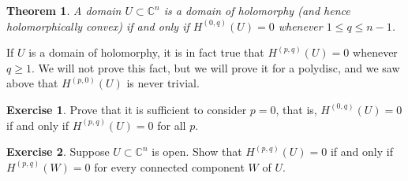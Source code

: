 \documentclass[12pt,openany]{book}
\newcommand{\C}{{\mathbb{C}}}
\theoremstyle{plain}
\newtheorem{thm}{Theorem}[section]
\theoremstyle{remark}
\theoremstyle{definition}
\newenvironment{exbox}{%
    \def\FrameCommand{\vrule width 1pt \relax\hspace{10pt}}%
    \MakeFramed{\advance\hsize-\width\FrameRestore}%
}{%
    \endMakeFramed
}
\theoremstyle{exercise}
\newtheorem{exercise}{Exercise}[section]
\theoremstyle{example}
\begin{document}
\begin{thm}
A domain $U \subset \C^n$ is a domain of holomorphy
(and hence holomorphically convex) if and only if $H^{(0,q)}(U) = 0$
whenever $1 \leq q \leq n-1$.
\end{thm}

If $U$ is a domain of holomorphy, it is in fact true that $H^{(p,q)}(U) = 0$
whenever $q \geq 1$.  We will not prove this fact, but we will prove it for a
polydisc, and we saw above that $H^{(p,0)}(U)$ is never trivial.

\begin{exbox}
\begin{exercise} \label{exercise:zeropsufficient}
Prove that
it is sufficient to consider $p=0$,
that is,
$H^{(0,q)}(U) = 0$ if and only if $H^{(p,q)}(U) = 0$ for all $p$.
\end{exercise}

\begin{exercise} \label{exercise:dobeaultdisconnected}
Suppose $U \subset \C^n$ is open.
Show that
$H^{(p,q)}(U) = 0$ if and only if $H^{(p,q)}(W) = 0$ for
every connected component $W$ of $U$.
\end{exercise}
\end{exbox}
\end{document}
